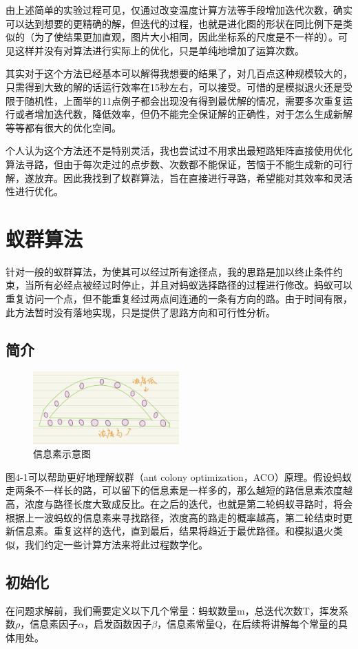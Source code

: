 \documentclass[12pt]{article}
\begin{document}
由上述简单的实验过程可见，仅通过改变温度计算方法等手段增加迭代次数，确实可以达到想要的更精确的解，但迭代的过程，也就是进化图的形状在同比例下是类似的（为了使结果更加直观，图片大小相同，因此坐标系的尺度是不一样的）。可见这样并没有对算法进行实际上的优化，只是单纯地增加了运算次数。

其实对于这个方法已经基本可以解得我想要的结果了，对几百点这种规模较大的，只需得到大致的解的话运行效率在15秒左右，可以接受。可惜的是模拟退火还是受限于随机性，上面举的11点例子都会出现没有得到最优解的情况，需要多次重复运行或者增加迭代数，降低效率，但仍不能完全保证解的正确性，对于怎么生成新解等等都有很大的优化空间。

个人认为这个方法还不是特别灵活，我也尝试过不用求出最短路矩阵直接使用优化算法寻路，但由于每次走过的点步数、次数都不能保证，苦恼于不能生成新的可行解，遂放弃。因此我找到了蚁群算法，旨在直接进行寻路，希望能对其效率和灵活性进行优化。
\newpage
\section{蚁群算法}
针对一般的蚁群算法，为使其可以经过所有途径点，我的思路是加以终止条件约束，当所有必经点被经过时停止，并且对蚂蚁选择路径的过程进行修改。蚂蚁可以重复访问一个点，但不能重复经过两点间连通的一条有方向的路。由于时间有限，此方法暂时没有落地实现，只是提供了思路方向和可行性分析。
\subsection{简介}
\setcounter{figure}{0}
\begin{figure}[h]
    \centering
    \includegraphics[width = 0.5\textwidth]{assets/ant.jpeg}
    \caption{\label{fig ant.jpeg}信息素示意图}
\end{figure}
图4-1可以帮助更好地理解蚁群（ant colony optimization，ACO）原理。假设蚂蚁走两条不一样长的路，可以留下的信息素是一样多的，那么越短的路信息素浓度越高，浓度与路径长度大致成反比。在之后的迭代，也就是第二轮蚂蚁寻路时，将会根据上一波蚂蚁的信息素来寻找路径，浓度高的路走的概率越高，第二轮结束时更新信息素。重复这样的迭代，直到最后，结果将趋近于最优路径。和模拟退火类似，我们约定一些计算方法来将此过程数学化。
\subsection{初始化}
在问题求解前，我们需要定义以下几个常量：蚂蚁数量m，总迭代次数T，挥发系数$\rho$，信息素因子$\alpha$，启发函数因子$\beta$，信息素常量Q，在后续将讲解每个常量的具体用处。
\end{document}
